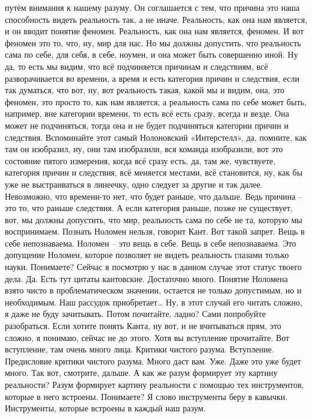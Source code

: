 путём внимания к нашему разуму. Он соглашается с тем, что причина это наша
способность видеть реальность так, а не иначе. Реальность, как она нам является,
и он вводит понятие феномен. Реальность, как она нам является, феномен. И вот
феномен это то, что, ну, мир для нас. Но мы должны допустить, что реальность
сама по себе, для себя, в себе, ноумен, и она может быть совершенно иной. Ну да,
то есть мы видим, что всё подчиняется причинам и следствиям, всё разворачивается
во времени, а время и есть категория причин и следствия, если так думаться, что
вот, ну, вот реальность такая, какой мы и видим, она, это феномен, это просто
то, как нам является, а реальность сама по себе может быть, например, вне
категории времени, то есть всё есть сразу, всегда и везде. Она может не
подчиняться, тогда она и не будет подчиняться категории причин и следствия.
Вспоминайте этот самый Нолоновский «Интерстелл», да, помните, как там он
изобразил, ну, они там изобразили, вся команда изобразили, вот это состояние
пятого измерения, когда всё сразу есть, да, там же, чувствуете, категория причин
и следствия, всё меняется местами, всё становится, ну, как бы уже не
выстраиваться в линеечку, одно следует за другие и так далее. Невозможно, что
времени-то нет, что будет раньше, что дальше. Ведь причина – это то, что раньше
следствия. А если категория раньше, позже не существует, вот, мы должны
допустить, что мир, реальность сама по себе не та, которую мы воспринимаем.
Познать Ноломен нельзя, говорит Кант. Вот такой запрет. Вещь в себе
непознаваема. Ноломен – это вещь в себе. Вещь в себе непознаваема. Это допущение
Ноломен, которое позволяет не видеть реальность глазами только науки. Понимаете?
Сейчас я посмотрю у нас в данном случае этот статус твоего дела. Да. Есть тут
цитаты кантовские. Достаточно много. Понятие Ноломена взято чисто в
проблематическом значении, остается не только допустимым, но и необходимым. Наш
рассудок приобретает… Ну, в этот случай его читать сложно, я даже не буду
зачитывать. Потом почитайте, ладно? Сами попробуйте разобраться. Если хотите
понять Канта, ну вот, и не вчитываться прям, это сложно, я понимаю, сейчас не до
этого. Хотя вы вступление прочитайте. Вот вступление, там очень много лица.
Критики чистого разума. Вступление. Предисловие критики чистого разума. Много
даст вам. Уже. Даже это уже будет много. Так вот, смотрите, дальше. А как же
разум формирует эту картину реальности? Разум формирует картину реальности с
помощью тех инструментов, которые в него встроены. Понимаете? Я слово
инструменты беру в кавычки. Инструменты, которые встроены в каждый наш разум.
